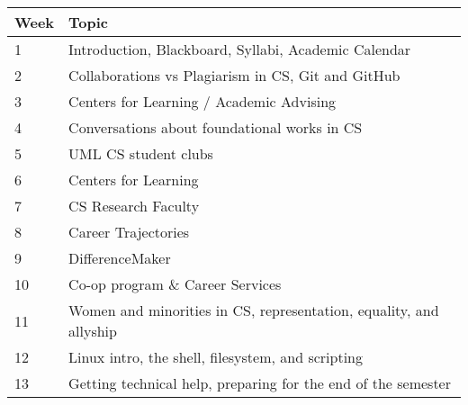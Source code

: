 \begin{center}
\begin{tabular}{|l|l|}\hline
Week & Topic \\ \hline
1 & Introduction, Blackboard, Syllabi, Academic Calendar\\ \hline
2 & Collaborations vs Plagiarism in CS, Git and GitHub\\ \hline
3 & Centers for Learning / Academic Advising\\ \hline
4 & Conversations about foundational works in CS\\ \hline
5 & UML CS student clubs\\ \hline
6 & Centers for Learning\\ \hline
7 & CS Research Faculty\\ \hline
8 & Career Trajectories\\ \hline
9 & DifferenceMaker\\ \hline
10 & Co-op program \& Career Services\\ \hline
11 & Women and minorities in CS, representation, equality, and allyship\\ \hline
12 & Linux intro, the shell, filesystem, and scripting\\ \hline
13 & Getting technical help, preparing for the end of the semester\\ \hline
\end{tabular}
\end{center}

